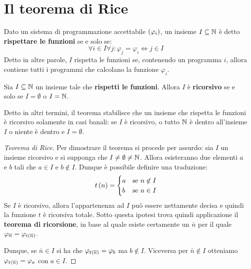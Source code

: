 \documentclass{lectures}
\begin{document}
\chapter{Il teorema di Rice}
\begin{multicols}{2}
    \begin{definition}
        Dato un sistema di programmazione accettabile \(\left(\varphi_i\right)\), un insieme \(I\subseteq \mathbb{N}\) è detto \textbf{rispettare le funzioni} se e solo se:
        \[
            \forall i \in I \forall j: \varphi_j = \varphi_i \Leftrightarrow j \in I
        \]
        Detto in altre parole, \(I\) rispetta le funzioni se, contenendo un programma \(i\), allora contiene tutti i programmi che calcolano la funzione \(\varphi_i\).
    \end{definition}
    \begin{theorem}
        Sia \(I \subseteq \mathbb{N}\) un insieme tale che \textbf{rispetti le funzioni}. Allora \(I\) è \textbf{ricorsivo} se e solo se \(I = \emptyset\) o \(I=\mathbb{N}\).
        
        Detto in altri termini, il teorema stabilisce che un insieme che rispetta le funzioni è ricorsivo solamente in casi banali: se \(I\) è ricorsivo, o tutto \(\mathbb{N}\) è dentro all'insieme \(I\) o niente è dentro e \(I = \emptyset\).
    \end{theorem}
    \begin{proof}[Teorema di Rice]
        Per dimostrare il teorema si procede per assurdo: sia \(I\) un insieme ricorsivo e si supponga che \(I \neq \emptyset \neq \mathbb{N}\). Allora esisteranno due elementi \(a\) e \(b\) tali che \(a \in I\) e \(b \not\in I\). Dunque è possibile definire una traduzione:
        \[
            t\left(n\right) = \begin{cases}
                a & \text{se }n \not\in I\\
                b & \text{se }n \in I
            \end{cases}
        \]
        Se \(I\) è ricorsivo, allora l'appartenenza ad \(I\) può essere nettamente decisa e quindi la funzione \(t\) è ricorsiva totale. Sotto questa ipotesi trova quindi applicazione il \textbf{teorema di ricorsione}, in base al quale esiste certamente un \(\bar{n}\) per il quale \(\varphi_{\overline{n}} = \varphi_{t\left(\overline{n}\right)}\).
        
        Dunque, se \(\bar{n} \in I\) si ha che \(\varphi_{t\left(\overline{n}\right)} = \varphi_b\) ma \(b \not\in I\). Viceversa per \(\bar{n} \not\in I\) otteniamo \(\varphi_{t\left(\overline{n}\right)} = \varphi_a\) con \(a \in I\).
        

\end{proof}
\end{multicols}
\end{document}
